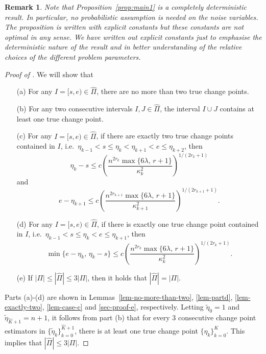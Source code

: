 \documentclass{article}
\newtheorem{remark}{Remark}
\begin{document}
\begin{remark}
Note that Proposition~\ref{prop:main1} is a completely deterministic result. In particular, no probabilistic assumption is needed on the noise variables.  The proposition is written with explicit constants but these constants are not optimal in any sense.  We have written out explicit constants just to emphasise the deterministic nature of the result and in better understanding of the relative choices of the different problem parameters. 
\end{remark}

\begin{proof}[Proof of ]
We will show that 
\begin{itemize}
	\item [(a)]	For any $I = [s, e) \in \widehat{\Pi}$, there are no more than two true change points. 
	\item [(b)]	For any two consecutive intervals $I, J \in \widehat{\Pi}$, the interval $I \cup J$ contains at least one true change point. 
	\item [(c)] For any $I = [s, e) \in \widehat{\Pi}$, if there are exactly two true change points contained in $I$, i.e.~$\eta_{k-1} < s \leq \eta_k < \eta_{k+1} < e \leq \eta_{k+2}$, then 
		\[
			\eta_k - s \leq c\left(\frac{n^{2r_k}\max\{6 \lambda, \, r + 1\}}{\kappa_k^2}\right)^{1/(2r_k + 1)}
		\]
		and
		\[
			e - \eta_{k+1} \leq c\left(\frac{n^{2r_{k+1}}\max\{6 \lambda, \, r + 1\}}{\kappa_{k+1}^2}\right)^{1/(2r_{k+1} + 1)}.
		\]
	\item [(d)] For any $I = [s, e) \in \widehat{\Pi}$, if there is exactly one true change point contained in $I$, i.e.~$\eta_{k-1} < s \leq \eta_k < e \leq \eta_{k+1}$, then
		\[
			\min\{e - \eta_k, \, \eta_k - s\} \leq c\left(\frac{n^{2r_k}\max\{6 \lambda, \, r + 1\}}{\kappa_k^2}\right)^{1/(2r_k + 1)}.
		\]
	\item [(e)] If $|\Pi| \leq |\widehat{\Pi}| \leq 3|\Pi|$, then it holds that $|\widehat{\Pi}| = |\Pi|$. 
\end{itemize}

Parts (a)-(d) are shown in Lemmas~\ref{lem-no-more-than-two}, \ref{lem-partd}, \ref{lem-exactly-two}, \ref{lem-case-c} and \ref{sec-proof-e}, respectively.  Letting $\widetilde{\eta}_0 = 1$ and $\widetilde{\eta}_{\widehat{K} + 1} = n+1$, it follows from part (b) that for every 3 consecutive change point estimators in $\{\widetilde{\eta}_k\}_{k = 0}^{\widehat{K} + 1}$, there is at least one true change point $\{\eta_k\}_{k = 0}^{K}$.  This implies that $|\widehat{\Pi}| \leq 3 |\Pi|$. 


\end{proof}
\end{document}
